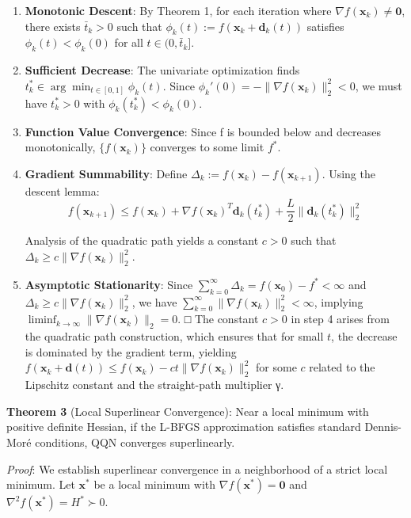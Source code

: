 \begin{enumerate}
\def\labelenumi{\arabic{enumi}.}
\item
  \textbf{Monotonic Descent}: By Theorem 1, for each iteration where \(\nabla f(\mathbf{x}_k) \neq \mathbf{0}\), there exists \(\bar{t}_k > 0\) such that \(\phi_k(t) := f(\mathbf{x}_k + \mathbf{d}_k(t))\) satisfies \(\phi_k(t) < \phi_k(0)\) for all \(t \in (0, \bar{t}_k]\).
\item
  \textbf{Sufficient Decrease}: The univariate optimization finds \(t_k^* \in \arg\min_{t \in [0,1]} \phi_k(t)\).
  Since \(\phi_k'(0) = -\|\nabla f(\mathbf{x}_k)\|_2^2 < 0\), we must have \(t_k^* > 0\) with \(\phi_k(t_k^*) < \phi_k(0)\).
\item
  \textbf{Function Value Convergence}: Since f is bounded below and decreases monotonically, \(\{f(\mathbf{x}_k)\}\) converges to some limit \(f^*\).
\item
  \textbf{Gradient Summability}: Define \(\Delta_k := f(\mathbf{x}_k) - f(\mathbf{x}_{k+1})\). Using the descent lemma:
  \[f(\mathbf{x}_{k+1}) \leq f(\mathbf{x}_k) + \nabla f(\mathbf{x}_k)^T \mathbf{d}_k(t_k^*) + \frac{L}{2}\|\mathbf{d}_k(t_k^*)\|_2^2\]

  Analysis of the quadratic path yields a constant \(c > 0\) such that \(\Delta_k \geq c\|\nabla f(\mathbf{x}_k)\|_2^2\).
\item
  \textbf{Asymptotic Stationarity}: Since \(\sum_{k=0}^{\infty} \Delta_k = f(\mathbf{x}_0) - f^* < \infty\) and
  \(\Delta_k \geq c\|\nabla f(\mathbf{x}_k)\|_2^2\), we have \(\sum_{k=0}^{\infty} \|\nabla f(\mathbf{x}_k)\|_2^2 < \infty\),
  implying \(\liminf_{k \to \infty} \|\nabla f(\mathbf{x}_k)\|_2 = 0\). □
  The constant \(c > 0\) in step 4 arises from the quadratic path construction, which ensures that for small \(t\), the decrease is dominated by the gradient term, yielding \(f(\mathbf{x}_k + \mathbf{d}(t)) \leq f(\mathbf{x}_k) - ct\|\nabla f(\mathbf{x}_k)\|_2^2\) for some \(c\) related to the Lipschitz constant and the straight-path multiplier γ.
\end{enumerate}

\textbf{Theorem 3} (Local Superlinear Convergence): Near a local minimum with positive definite Hessian, if the L-BFGS approximation satisfies standard Dennis-Moré conditions, QQN converges superlinearly.

\emph{Proof}: We establish superlinear convergence in a neighborhood of a strict local minimum. Let \(\mathbf{x}^*\) be a local minimum with \(\nabla f(\mathbf{x}^*) = \mathbf{0}\) and \(\nabla^2 f(\mathbf{x}^*) = H^* \succ 0\).

